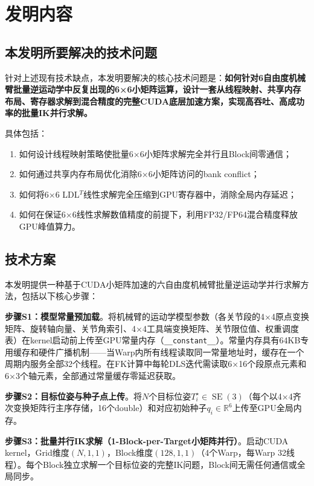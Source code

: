 \documentclass[a4paper,12pt]{ctexart}
\newcommand{\R}{\mathbb{R}}
\DeclareMathOperator{\SE}{SE}
\begin{document}
\section{发明内容}

\subsection{本发明所要解决的技术问题}

针对上述现有技术缺点，本发明要解决的核心技术问题是：\textbf{如何针对6自由度机械臂批量逆运动学中反复出现的6×6小矩阵运算，设计一套从线程映射、共享内存布局、寄存器求解到混合精度的完整CUDA底层加速方案，实现高吞吐、高成功率的批量IK并行求解。}

具体包括：
\begin{enumerate}[label=(\arabic*)]
    \item 如何设计线程映射策略使批量6×6小矩阵求解完全并行且Block间零通信；
    \item 如何通过共享内存布局优化消除6×6小矩阵访问的bank conflict；
    \item 如何将6×6 LDL$^T$线性求解完全压缩到GPU寄存器中，消除全局内存延迟；
    \item 如何在保证6×6线性求解数值精度的前提下，利用FP32/FP64混合精度释放GPU峰值算力。
\end{enumerate}

\subsection{技术方案}

本发明提供一种基于CUDA小矩阵加速的六自由度机械臂批量逆运动学并行求解方法，包括以下核心步骤：

\textbf{步骤S1：模型常量预加载}。将机械臂的运动学模型参数（各关节段的4×4原点变换矩阵、旋转轴向量、关节角索引、4×4工具端变换矩阵、关节限位值、权重调度表）在kernel启动前上传至GPU常量内存（\texttt{\_\_constant\_\_}）。常量内存具有64KB专用缓存和硬件广播机制——当Warp内所有线程读取同一常量地址时，缓存在一个周期内服务全部32个线程。在FK计算中每轮DLS迭代需读取6×16个段原点元素和6×3个轴元素，全部通过常量缓存零延迟获取。

\textbf{步骤S2：目标位姿与种子点上传}。将$N$个目标位姿$T^\star_i\in\SE(3)$（每个以4×4齐次变换矩阵行主序存储，16个double）和对应初始种子$q_{i}\in\R^6$上传至GPU全局内存。

\textbf{步骤S3：批量并行IK求解（1-Block-per-Target小矩阵并行）}。启动CUDA kernel，Grid维度$(N,1,1)$，Block维度$(128,1,1)$（4个Warp，每Warp 32线程）。每个Block独立求解一个目标位姿的完整IK问题，Block间无需任何通信或全局同步。
\end{document}
